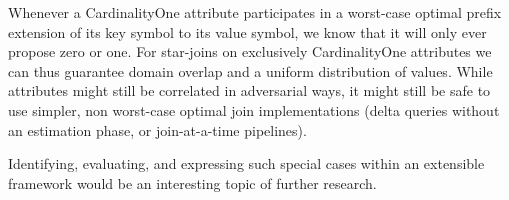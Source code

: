 \documentclass[../index.tex]{subfiles}
\begin{document}
Whenever a CardinalityOne attribute participates in a worst-case
optimal prefix extension of its key symbol to its value symbol, we
know that it will only ever propose zero or one. For star-joins on
exclusively CardinalityOne attributes we can thus guarantee domain
overlap and a uniform distribution of values. While attributes might
still be correlated in adversarial ways, it might still be safe to use
simpler, non worst-case optimal join implementations (delta queries
without an estimation phase, or join-at-a-time pipelines).

Identifying, evaluating, and expressing such special cases within an
extensible framework would be an interesting topic of further
research.
\end{document}

